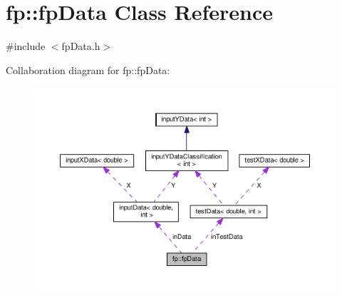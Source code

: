 \hypertarget{classfp_1_1fpData}{}\section{fp\+:\+:fp\+Data Class Reference}
\label{classfp_1_1fpData}


{\ttfamily \#include $<$fp\+Data.\+h$>$}



Collaboration diagram for fp\+:\+:fp\+Data\+:\nopagebreak
\begin{figure}[H]
\begin{center}
\leavevmode
\includegraphics[width=350pt]{classfp_1_1fpData__coll__graph}
\end{center}
\end{figure}
